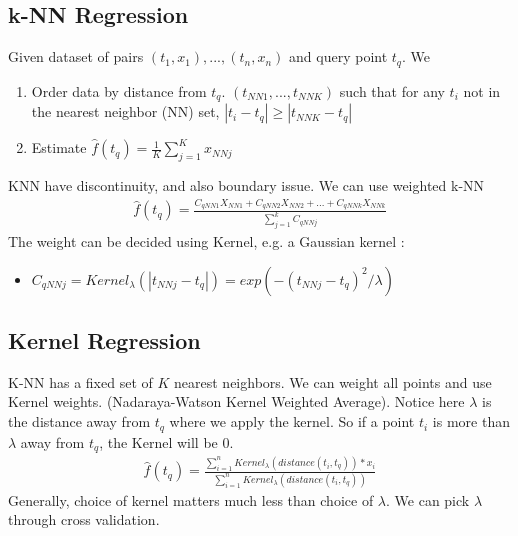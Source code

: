 \subsection{k-NN Regression}
Given dataset of pairs $(t_1, x_1), ..., (t_n, x_n)$ and query point $t_q$. We 
    \begin{enumerate}
        \item Order data by distance from $t_q$.  $(t_{NN1},...,t_{NNK})$ such that for any $t_i$ not in the nearest neighbor (NN) set, $|t_i - t_q| \geq |t_{NNK} - t_q|$
        \item  Estimate $\hat{f}(t_q) = \frac{1}{K} \sum_{j=1}^K x_{NNj}$
    \end{enumerate}
KNN have discontinuity, and also boundary issue. We can use weighted k-NN
    \begin{align*}
        \hat{f}(t_q) = \frac{C_{qNN1}X_{NN1} + C_{qNN2}X_{NN2} + ... + C_{qNNk}X_{NNk}}{\sum_{j=1}^k C_{qNNj}}
    \end{align*}
The weight can be decided using Kernel, e.g. a Gaussian kernel : 
    \begin{itemize}
        \item $C_{qNNj} = Kernel_{\lambda}(|t_{NNj} - t_q|) = exp(-(t_{NNj} - t_q)^2 / \lambda)$
    \end{itemize}
\subsection{Kernel Regression}
K-NN has a fixed set of $K$ nearest neighbors. We can weight all points and use Kernel weights. (Nadaraya-Watson Kernel Weighted Average). Notice here $\lambda$ is the distance away from $t_q$ where we apply the kernel. So if a point $t_i$ is more than $\lambda$ away from $t_q$, the Kernel will be 0. 
    \begin{align*}
        \hat{f}(t_q) = \frac{\sum_{i=1}^{n} Kernel_\lambda(distance(t_i, t_q)) * x_i }{\sum_{i=1}^{n} Kernel_\lambda(distance(t_i, t_q))}
    \end{align*}
Generally, choice of kernel matters much less than choice of $\lambda$. We can pick $\lambda$ through cross validation. 



